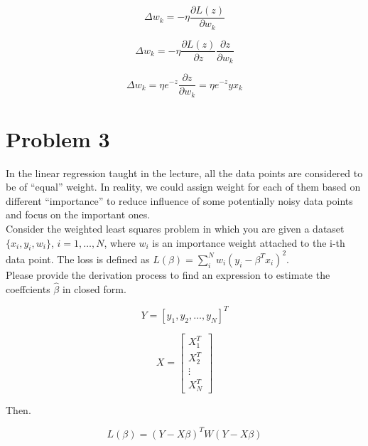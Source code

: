\documentclass{article}
\begin{document}
\begin{equation}
    \Delta w_k = - \eta \frac{\partial L(z)}{\partial w_k}
\end{equation}

\begin{equation}
    \Delta w_k = - \eta \frac{\partial L(z)}{\partial z} \frac{\partial z}{\partial w_k}
\end{equation}

\begin{equation}
    \Delta w_k = \eta e^{-z} \frac{\partial z}{\partial w_k} = \eta e^{-z} y x_k
\end{equation}


\section*{Problem 3}

In the linear regression taught in the lecture, all the data points are considered to be of ``equal'' weight. In reality, we could assign weight for each of them based on different ``importance'' to reduce influence of some potentially noisy data points and focus on the important ones.
\\
Consider the weighted least squares problem in which you are given a dataset $\{x_i,y_i,w_i\}$, $i = 1,\ldots,N$, where $w_i$ is an importance weight attached to the i-th data point. The loss is defined as $L(\beta) = \sum_{i}^{N} {w_i}{{(y_i - \beta^T x_i)}^2}$.
\\
Please provide the derivation process to find an expression to estimate the coeffcients $\hat{\beta}$ in closed form.

\begin{equation}
    Y = {[y_1, y_2, \ldots, y_N]}^T
\end{equation}

\begin{equation}
    X = {\begin{bmatrix}
        X_1^T \\
        X_2^T \\
        \vdots \\
        X_N^T
        \end{bmatrix}}
\end{equation}

Then.

\begin{equation}
    L(\beta) = {(Y - X\beta)}^T{W(Y - X\beta)}
\end{equation}
\end{document}
